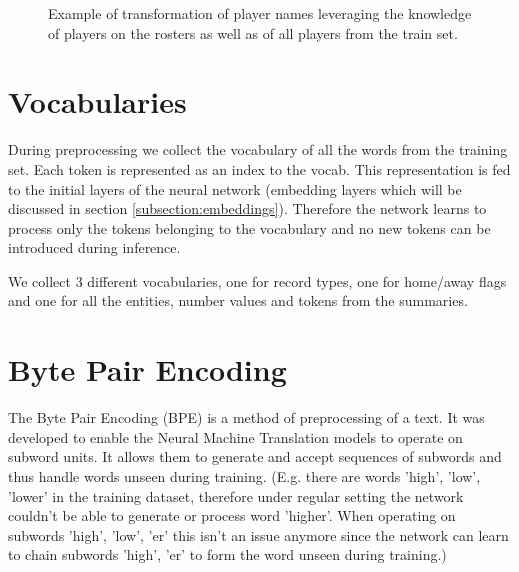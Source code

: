 \begin{figure}[!h]
    \centering
    \usetikzlibrary{shapes.multipart}
    \caption{Example of transformation of player names leveraging the knowledge of players on the rosters as well as of all players from the train set.} \label{figure:original_vs_ours_player_transformations_summary}
\end{figure}

\section{Vocabularies}

During preprocessing we collect the vocabulary of all the words from the training set. Each token is represented as an index to the vocab. This representation is fed to the initial layers of the neural network (embedding layers which will be discussed in section \ref{subsection:embeddings}). Therefore the network learns to process only the tokens belonging to the vocabulary and no new tokens can be introduced during inference.

We collect 3 different vocabularies, one for record types, one for home/away flags and one for all the entities, number values and tokens from the summaries.

\section{Byte Pair Encoding} \label{section:byte_pair_encoding}

The Byte Pair Encoding (BPE) \citep{sennrich2016} is a method of preprocessing of a text. It was developed to enable the Neural Machine Translation models to operate on subword units. It allows them to generate and accept sequences of subwords and thus handle words unseen during training. (E.g. there are words 'high', 'low', 'lower' in the training dataset, therefore under regular setting the network couldn't be able to generate or process word 'higher'. When operating on subwords 'high', 'low', 'er' this isn't an issue anymore since the network can learn to chain subwords 'high', 'er' to form the word unseen during training.)


